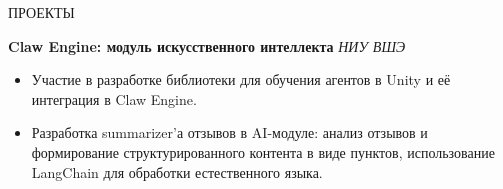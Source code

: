 \documentclass{resume}
\begin{document}
\begin{rSection}{ПРОЕКТЫ}

\textbf{Claw Engine: модуль искусственного интеллекта}  
\textit{НИУ ВШЭ}  
\begin{itemize}
    \itemsep -3pt {} 
    \item Участие в разработке библиотеки для обучения агентов в Unity и её интеграция в Claw Engine.
    \item Разработка summarizer'а отзывов в AI-модуле: анализ отзывов и формирование структурированного контента в виде пунктов, использование LangChain для обработки естественного языка.
\end{itemize}

\end{rSection}
\end{document}
